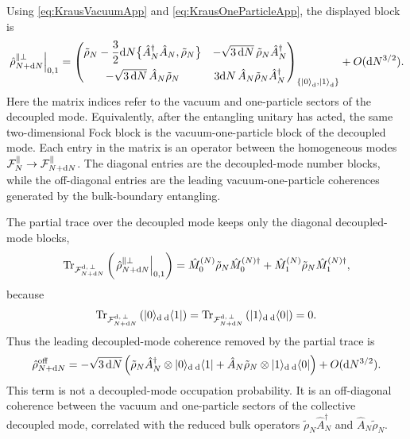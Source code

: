\documentclass{article}
\def\cF{{\cal F}}
\def\Tr{\mathrm{Tr}}
\numberwithin{equation}{section}
\begin{document}
	Using \cref{eq:KrausVacuumApp} and \cref{eq:KrausOneParticleApp}, the displayed block is
	\begin{equation}
		\left. \hat\rho_{N+\dd N}^{\parallel\perp} \right|_{0,1} =
		\begin{pmatrix}
			\tilde{\rho}_N - \dfrac32 \dd N \bigl\{ \hat A_N^\dagger\hat A_N,\tilde{\rho}_N \bigr\} & -\sqrt{3\,\dd N}\, \tilde{\rho}_N\hat A_N^\dagger \\[8pt] -\sqrt{3\,\dd N}\, \hat A_N\tilde{\rho}_N & 3\dd N\,\hat A_N\tilde{\rho}_N\hat A_N^\dagger
		\end{pmatrix}_{\{\ket{0}_{\rm d},\ket{1}_{\rm d}\}}
		+ O(\dd N^{3/2}) .
		\label{eq:FullStateBlock01ExpandedApp}
	\end{equation}
	Here the matrix indices refer to the vacuum and one-particle sectors of the decoupled mode. Equivalently, after the entangling unitary has acted, the same two-dimensional Fock block is the vacuum-one-particle block of the decoupled mode. Each entry in the matrix is an operator between the homogeneous modes \(\cF_N^\parallel\to\cF_{N+\dd N}^\parallel\). The diagonal entries are the decoupled-mode number blocks, while the off-diagonal entries are the leading vacuum-one-particle coherences generated by the bulk-boundary entangling.

	The partial trace over the decoupled mode keeps only the diagonal decoupled-mode blocks,
	\begin{equation}
		\Tr_{\cF^{\rm d,\,\perp}_{N+\dd N}} \left( \left. \hat\rho_{N+\dd N}^{\parallel\perp} \right|_{0,1} \right) = \hat M_0^{(N)}\tilde{\rho}_N\hat M_0^{(N)\dagger} + \hat M_1^{(N)}\tilde{\rho}_N\hat M_1^{(N)\dagger},
	\end{equation}
	because
	\begin{equation}
		\Tr_{\cF^{\rm d,\,\perp}_{N+\dd N}} \left( \ket{0}{}\!_{\rm d}\,{}_{\rm d}\!\bra{1} \right) = \Tr_{\cF^{\rm d,\,\perp}_{N+\dd N}} \left( \ket{1}\!{}_{\rm d}\,{}_{\rm d}\!\bra{0} \right) = 0 .
	\end{equation}
	Thus the leading decoupled-mode coherence removed by the partial trace is
	\begin{equation}
		\hat\rho^{\rm off}_{N+\dd N} = -\sqrt{3\,\dd N} \left( \tilde{\rho}_N\hat A_N^\dagger \otimes \ket{0}\!{}_{\rm d}\,{}_{\rm d}\!\bra{1} + \hat A_N\tilde{\rho}_N \otimes \ket{1}\!{}_{\rm d}\,{}_{\rm d}\!\bra{0} \right) + O(\dd N^{3/2}) .
		\label{eq:DiscardedFockCoherenceApp}
	\end{equation}
	This term is not a decoupled-mode occupation probability. It is an off-diagonal coherence between the vacuum and one-particle sectors of the collective decoupled mode, correlated with the reduced bulk operators \(\tilde\rho_N\hat A_N^\dagger\) and \(\hat A_N\tilde\rho_N\).
\end{document}
